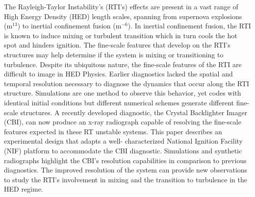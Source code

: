 The Rayleigh-Taylor Instability's (RTI's) effects are present in a vast range of High Energy Density (HED) length scales, spanning from supernova explosions (m$^{13}$) to inertial confinement fusion (m$^{-6}$).  In inertial confinement fusion, the RTI is known to induce mixing or turbulent transition which in turn cools the hot spot and hinders ignition.  The fine-scale features that develop on the RTI's structures may help determine if the system is mixing or transitioning to turbulence. Despite its ubiquitous nature, the fine-scale features of the RTI are difficult to image in HED Physics.  Earlier diagnostics lacked the spatial and temporal resolution necessary to diagnose the dynamics that occur along the RTI structure.  Simulations are one method to observe this behavior, yet codes with identical initial conditions but different numerical schemes generate different fine-scale structures.  A recently developed diagnostic, the Crystal Backlighter Imager (CBI), can now produce an x-ray radiograph capable of resolving the fine-scale features expected in these RT unstable systems. This paper describes an experimental design that adapts a well- characterized National Ignition Facility (NIF) platform to accommodate the CBI diagnostic. Simulations and synthetic radiographs highlight the CBI's resolution capabilities in comparison to previous diagnostics. The improved resolution of the system can provide new observations to study the RTI's involvement in mixing and the transition to turbulence in the HED regime.  


